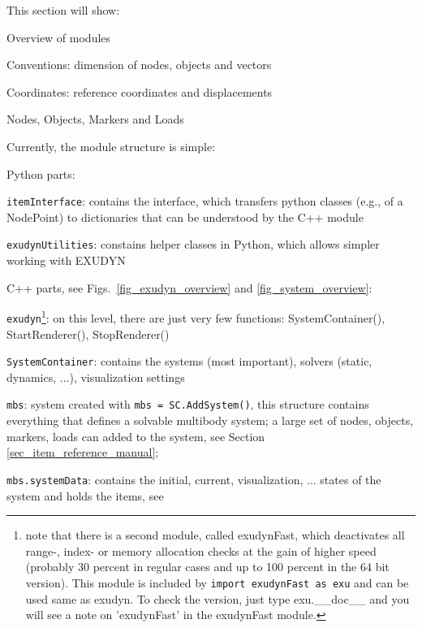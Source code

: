 
 \label{sec_programStructure}
This section will show:
\bi
  \item Overview of modules
  \item Conventions: dimension of nodes, objects and vectors
	\item Coordinates: reference coordinates and displacements
	\item Nodes, Objects, Markers and Loads
\ei

Currently, the module structure is simple:
\bi
  \item Python parts:
	\bi
	  \item \texttt{itemInterface}: contains the interface, which transfers python classes (e.g., of a NodePoint) to dictionaries that can be understood by the C++ module
	  \item \texttt{exudynUtilities}: constains helper classes in Python, which allows simpler working with EXUDYN
	\ei
  \item C++ parts, see Figs.\ \ref{fig_exudyn_overview} and \ref{fig_system_overview}:
	\bi
	  \item \texttt{exudyn}\footnote{note that there is a second module, called exudynFast, which deactivates all range-, index- or memory allocation checks at the gain of higher speed (probably 30 percent in regular cases and up to 100 percent in the 64 bit version). This module is included by \texttt{import exudynFast as exu} and can be used same as exudyn. To check the version, just type exu.\_\_doc\_\_ and you will see a note on 'exudynFast' in the exudynFast module.}: on this level, there are just very few functions: SystemContainer(), StartRenderer(), StopRenderer()
	  \item \texttt{SystemContainer}: contains the systems (most important), solvers (static, dynamics, ...), visualization settings
	  \item \texttt{mbs}: system created with \texttt{mbs = SC.AddSystem()}, this structure contains everything that defines a solvable multibody system; a large set of nodes, objects, markers, 
		loads can added to the system, see Section \ref{sec_item_reference_manual};
		\item \texttt{mbs.systemData}: contains the initial, current, visualization, ... states of the system and holds the items, see 
	\ei
\ei
%
